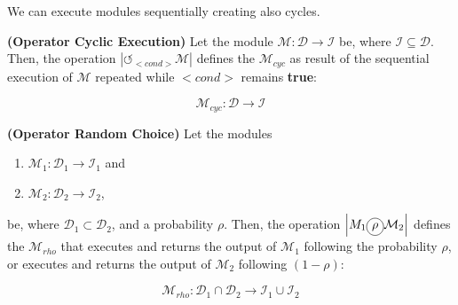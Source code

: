 We can execute modules sequentially creating also cycles.

\begin{definition}\label{op:cyclic}
{\bf (Operator Cyclic Execution)} Let the module $\mathcal{M} : \mathcal{D} \rightarrow \mathcal{I}$ be, where $\mathcal{I} \subseteq \mathcal{D}$. Then, the operation $\left|\circlearrowleft_{<cond>}\mathcal{M}\right|$ defines the \cm{} $\mathcal{M}_{cyc}$ as result of the sequential execution of $\mathcal{M}$ repeated while $<cond>$ remains {\bf true}:

\[
\mathcal{M}_{cyc}:\mathcal{D} \rightarrow \mathcal{I} 
\]
\end{definition}

%
%	
%
%


\begin{definition}\label{op:rho}
{\bf (Operator Random Choice)} Let the modules
\begin{enumerate}%
	\item $\mathcal{M}_1 : \mathcal{D}_1 \rightarrow \mathcal{I}_1$ and  
	\item $\mathcal{M}_2 : \mathcal{D}_2 \rightarrow \mathcal{I}_2$,
\end{enumerate}%
be, where $\mathcal{D}_1 \subset \mathcal{D}_2$, %
and a probability $\rho$. Then, the operation $\left|M_1\circled{$\rho$}\mathcal{M}_2\right|$ defines the \cm{} $\mathcal{M}_{rho}$ that executes and returns the output of $\mathcal{M}_1$ following the probability $\rho$, or executes and returns the output of $\mathcal{M}_2$ following $(1-\rho)$:

\[
\mathcal{M}_{rho}:\mathcal{D}_1\cap\mathcal{D}_2 \rightarrow \mathcal{I}_1 \cup \mathcal{I}_2 
\]
\end{definition}

